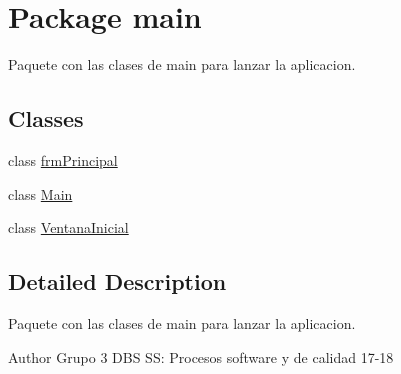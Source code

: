 \hypertarget{namespacemain}{}\section{Package main}
\label{namespacemain}


Paquete con las clases de main para lanzar la aplicacion.  


\subsection*{Classes}
\begin{DoxyCompactItemize}
\item 
class \hyperlink{classmain_1_1frm_principal}{frm\+Principal}
\item 
class \hyperlink{classmain_1_1_main}{Main}
\item 
class \hyperlink{classmain_1_1_ventana_inicial}{Ventana\+Inicial}
\end{DoxyCompactItemize}


\subsection{Detailed Description}
Paquete con las clases de main para lanzar la aplicacion. 

\begin{DoxyAuthor}{Author}
Grupo 3 D\+BS SS\+: Procesos software y de calidad 17-\/18 
\end{DoxyAuthor}
